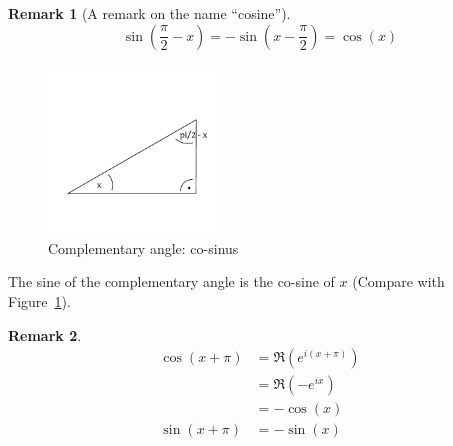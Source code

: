\documentclass[a4paper,landscape,twocolumn]{article}
\theoremstyle{definition}
\newtheorem{rem}{Remark}
\begin{document}
\begin{rem}[A remark on the name \enquote{cosine}]
  \[ \sin\left(\frac\pi2 - x\right) = -\sin\left(x - \frac\pi2\right) = \cos(x) \]

  \begin{figure}[!h]
    \begin{center}
      \includegraphics[width=0.4\textwidth]{img/complementary-angle.pdf}
      \caption{Complementary angle: co-sinus}
      \label{img:cosine}
    \end{center}
  \end{figure}

  The sine of the complementary angle is the co-sine of $x$ (Compare with Figure~\ref{img:cosine}).
\end{rem}

\begin{rem}
  \begin{align*}
    \cos(x + \pi) &= \Re(e^{i(x + \pi)}) \\
      &= \Re(-e^{ix}) \\
      &= -\cos(x) \\
    \sin(x + \pi) &= - \sin(x)
  \end{align*}
\end{rem}
\end{document}
